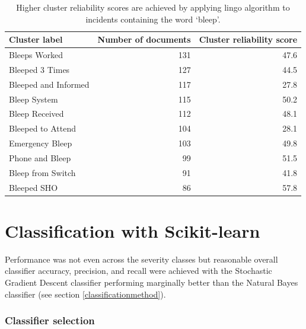 \begin{table}[htbp]\centering
\begin{tabular}{lrr}
\toprule
\textbf{Cluster label} & \textbf{Number of documents} & \textbf{Cluster reliability score} \\
\midrule
Bleeps Worked & 131 & 47.6 \\ 
Bleeped 3 Times & 127 & 44.5 \\ 
Bleeped and Informed & 117 & 27.8 \\ 
Bleep System & 115 & 50.2 \\ 
Bleep Received & 112 & 48.1 \\ 
Bleeped to Attend & 104 & 28.1 \\ 
Emergency Bleep & 103 & 49.8 \\ 
Phone and Bleep & 99 & 51.5 \\ 
Bleep from Switch & 91 & 41.8 \\ 
Bleeped SHO & 86 & 57.8 \\ 
\bottomrule
\end{tabular}
\label{tab:lingo_bleep_topten}
\caption{Higher cluster reliability scores are achieved by applying lingo algorithm to incidents containing the word `bleep'.}
\end{table}

\section{Classification with Scikit-learn}
\label{classificationresults}
Performance was not even across the severity classes but reasonable overall classifier accuracy, precision, and recall were achieved with the Stochastic Gradient Descent classifier performing marginally better than the Natural Bayes classifier (see section \ref{classificationmethod}). 




\subsubsection{Classifier selection}

